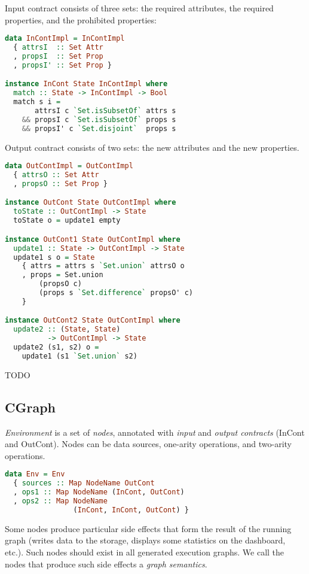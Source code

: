 Input contract consists of three sets: the required attributes, the required properties, and the prohibited properties:

\begin{lstlisting}[language=Haskell]
data InContImpl = InContImpl
  { attrsI  :: Set Attr
  , propsI  :: Set Prop
  , propsI' :: Set Prop }

instance InCont State InContImpl where
  match :: State -> InContImpl -> Bool
  match s i =
       attrsI c `Set.isSubsetOf` attrs s
    && propsI c `Set.isSubsetOf` props s
    && propsI' c `Set.disjoint`  props s
\end{lstlisting}

Output contract consists of two sets: the new attributes and the new properties.

\begin{lstlisting}[language=Haskell]
data OutContImpl = OutContImpl
  { attrsO :: Set Attr
  , propsO :: Set Prop }

instance OutCont State OutContImpl where
  toState :: OutContImpl -> State
  toState o = update1 empty

instance OutCont1 State OutContImpl where
  update1 :: State -> OutContImpl -> State
  update1 s o = State
    { attrs = attrs s `Set.union` attrsO o
    , props = Set.union
        (propsO c)
        (props s `Set.difference` propsO' c)
    }

instance OutCont2 State OutContImpl where
  update2 :: (State, State)
          -> OutContImpl -> State
  update2 (s1, s2) o =
    update1 (s1 `Set.union` s2)
\end{lstlisting}

TODO

\subsection{CGraph}

{\em Environment} is a set of {\em nodes}, annotated with {\em input} and {\em output contracts} (InCont and OutCont).
Nodes can be data sources, one-arity operations, and two-arity operations.

\begin{lstlisting}[language=Haskell]
data Env = Env
  { sources :: Map NodeName OutCont
  , ops1 :: Map NodeName (InCont, OutCont)
  , ops2 :: Map NodeName
                (InCont, InCont, OutCont) }
\end{lstlisting}

Some nodes produce particular side effects that form the result of the running graph (writes data to the storage, displays some statistics on the dashboard, etc.).
Such nodes should exist in all generated execution graphs.
We call the nodes that produce such side effects a {\em graph semantics}.

